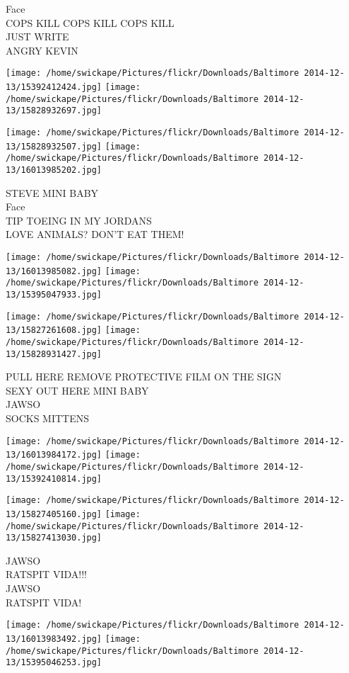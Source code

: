 \documentclass[10pt,letterpaper]{article}
\begin{document}
Face\\
COPS KILL COPS KILL COPS KILL\\
JUST WRITE\\
ANGRY KEVIN
\pagebreak

\texttt{[image: /home/swickape/Pictures/flickr/Downloads/Baltimore 2014-12-13/15392412424.jpg]}
\texttt{[image: /home/swickape/Pictures/flickr/Downloads/Baltimore 2014-12-13/15828932697.jpg]}

\texttt{[image: /home/swickape/Pictures/flickr/Downloads/Baltimore 2014-12-13/15828932507.jpg]}
\texttt{[image: /home/swickape/Pictures/flickr/Downloads/Baltimore 2014-12-13/16013985202.jpg]}

STEVE MINI BABY\\
Face\\
TIP TOEING IN MY JORDANS\\
LOVE ANIMALS?  DON'T EAT THEM!
\pagebreak

\texttt{[image: /home/swickape/Pictures/flickr/Downloads/Baltimore 2014-12-13/16013985082.jpg]}
\texttt{[image: /home/swickape/Pictures/flickr/Downloads/Baltimore 2014-12-13/15395047933.jpg]}

\texttt{[image: /home/swickape/Pictures/flickr/Downloads/Baltimore 2014-12-13/15827261608.jpg]}
\texttt{[image: /home/swickape/Pictures/flickr/Downloads/Baltimore 2014-12-13/15828931427.jpg]}

PULL HERE REMOVE PROTECTIVE FILM ON THE SIGN\\
SEXY OUT HERE MINI BABY\\
JAWSO\\
SOCKS MITTENS
\pagebreak

\texttt{[image: /home/swickape/Pictures/flickr/Downloads/Baltimore 2014-12-13/16013984172.jpg]}
\texttt{[image: /home/swickape/Pictures/flickr/Downloads/Baltimore 2014-12-13/15392410814.jpg]}

\texttt{[image: /home/swickape/Pictures/flickr/Downloads/Baltimore 2014-12-13/15827405160.jpg]}
\texttt{[image: /home/swickape/Pictures/flickr/Downloads/Baltimore 2014-12-13/15827413030.jpg]}

JAWSO\\
RATSPIT VIDA!!!\\
JAWSO\\
RATSPIT VIDA!
\pagebreak

\texttt{[image: /home/swickape/Pictures/flickr/Downloads/Baltimore 2014-12-13/16013983492.jpg]}
\texttt{[image: /home/swickape/Pictures/flickr/Downloads/Baltimore 2014-12-13/15395046253.jpg]}
\end{document}
